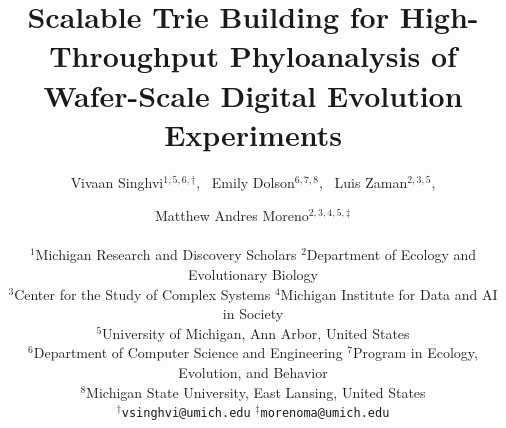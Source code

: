\title{Scalable Trie Building for High-Throughput Phyloanalysis of Wafer-Scale Digital Evolution Experiments}

\author{
    Vivaan Singhvi$^{1,5,6,\dagger}$,\ %
    Emily Dolson$^{6,7,8}$,\ %
    Luis Zaman$^{2,3,5}$, \and
    Matthew Andres Moreno$^{2,3,4,5,\ddagger}$ \\
    \mbox{}\\
    $^1$Michigan Research and Discovery Scholars
    $^2$Department of Ecology and Evolutionary Biology \\
    $^3$Center for the Study of Complex Systems
    $^4$Michigan Institute for Data and AI in Society \\
    $^5$University of Michigan, Ann Arbor, United States \\
    $^6$Department of Computer Science and Engineering
    $^7$Program in Ecology, Evolution, and Behavior \\
    $^8$Michigan State University, East Lansing, United States \\
    $^\dagger$\texttt{vsinghvi@umich.edu} $^\ddagger$\texttt{morenoma@umich.edu}
}

\maketitle


\maketitle
